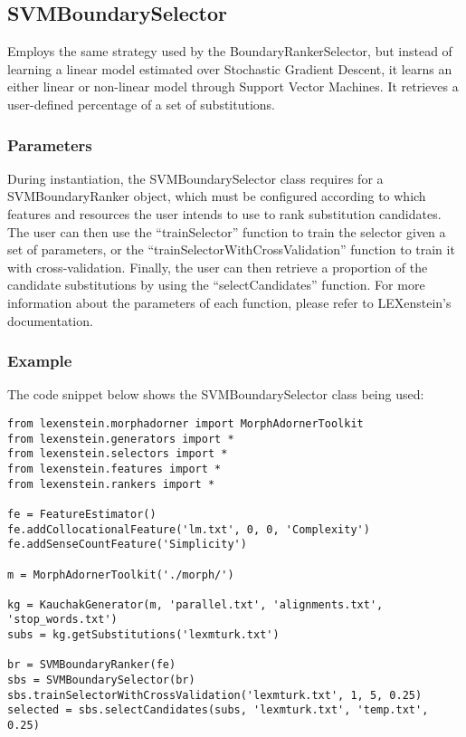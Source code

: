 \subsection{SVMBoundarySelector}

Employs the same strategy used by the BoundaryRankerSelector, but instead of learning a linear model estimated over Stochastic Gradient Descent, it learns an either linear or non-linear model through Support Vector Machines. It retrieves a user-defined percentage of a set of substitutions.

\subsubsection{Parameters}

During instantiation, the SVMBoundarySelector class requires for a SVMBoundaryRanker object, which must be configured according to which features and resources the user intends to use to rank substitution candidates. The user can then use the ``trainSelector'' function to train the selector given a set of parameters, or the ``trainSelectorWithCrossValidation'' function to train it with cross-validation. Finally, the user can then retrieve a proportion of the candidate substitutions by using the ``selectCandidates'' function. For more information about the parameters of each function, please refer to LEXenstein's documentation.

\subsubsection{Example}

The code snippet below shows the SVMBoundarySelector class being used:

\begin{lstlisting}
from lexenstein.morphadorner import MorphAdornerToolkit
from lexenstein.generators import *
from lexenstein.selectors import *
from lexenstein.features import *
from lexenstein.rankers import *

fe = FeatureEstimator()
fe.addCollocationalFeature('lm.txt', 0, 0, 'Complexity')
fe.addSenseCountFeature('Simplicity')

m = MorphAdornerToolkit('./morph/')

kg = KauchakGenerator(m, 'parallel.txt', 'alignments.txt', 'stop_words.txt')
subs = kg.getSubstitutions('lexmturk.txt')

br = SVMBoundaryRanker(fe)
sbs = SVMBoundarySelector(br)
sbs.trainSelectorWithCrossValidation('lexmturk.txt', 1, 5, 0.25)
selected = sbs.selectCandidates(subs, 'lexmturk.txt', 'temp.txt', 0.25)
\end{lstlisting}










